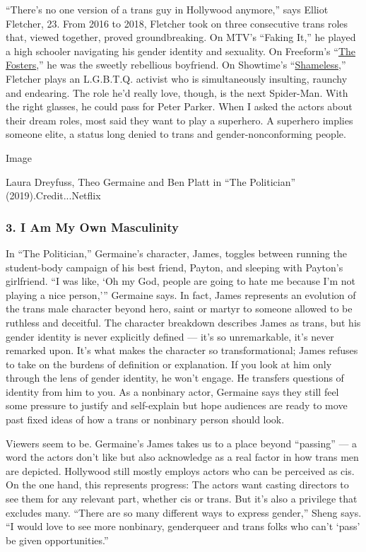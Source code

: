 ``There's no one version of a trans guy in Hollywood anymore,'' says
Elliot Fletcher, 23. From 2016 to 2018, Fletcher took on three
consecutive trans roles that, viewed together, proved groundbreaking. On
MTV's ``Faking It,'' he played a high schooler navigating his gender
identity and sexuality. On Freeform's
``\href{https://www.nytimes3xbfgragh.onion/watching/recommendations/the-fosters}{The
Fosters},'' he was the sweetly rebellious boyfriend. On Showtime's
``\href{https://www.nytimes3xbfgragh.onion/watching/recommendations/shameless-us}{Shameless},''
Fletcher plays an L.G.B.T.Q. activist who is simultaneously insulting,
raunchy and endearing. The role he'd really love, though, is the next
Spider-Man. With the right glasses, he could pass for Peter Parker. When
I asked the actors about their dream roles, most said they want to play
a superhero. A superhero implies someone elite, a status long denied to
trans and gender-nonconforming people.

Image

Laura Dreyfuss, Theo Germaine and Ben Platt in ``The Politician''
(2019).Credit...Netflix

\hypertarget{3-i-am-my-own-masculinity}{%
\subsubsection{3. I Am My Own
Masculinity}\label{3-i-am-my-own-masculinity}}

In ``The Politician,'' Germaine's character, James, toggles between
running the student-body campaign of his best friend, Payton, and
sleeping with Payton's girlfriend. ``I was like, `Oh my God, people are
going to hate me because I'm not playing a nice person,''' Germaine
says. In fact, James represents an evolution of the trans male character
beyond hero, saint or martyr to someone allowed to be ruthless and
deceitful. The character breakdown describes James as trans, but his
gender identity is never explicitly defined --- it's so unremarkable,
it's never remarked upon. It's what makes the character so
transformational; James refuses to take on the burdens of definition or
explanation. If you look at him only through the lens of gender
identity, he won't engage. He transfers questions of identity from him
to you. As a nonbinary actor, Germaine says they still feel some
pressure to justify and self-explain but hope audiences are ready to
move past fixed ideas of how a trans or nonbinary person should look.

Viewers seem to be. Germaine's James takes us to a place beyond
``passing'' --- a word the actors don't like but also acknowledge as a
real factor in how trans men are depicted. Hollywood still mostly
employs actors who can be perceived as cis. On the one hand, this
represents progress: The actors want casting directors to see them for
any relevant part, whether cis or trans. But it's also a privilege that
excludes many. ``There are so many different ways to express gender,''
Sheng says. ``I would love to see more nonbinary, genderqueer and trans
folks who can't `pass' be given opportunities.''

